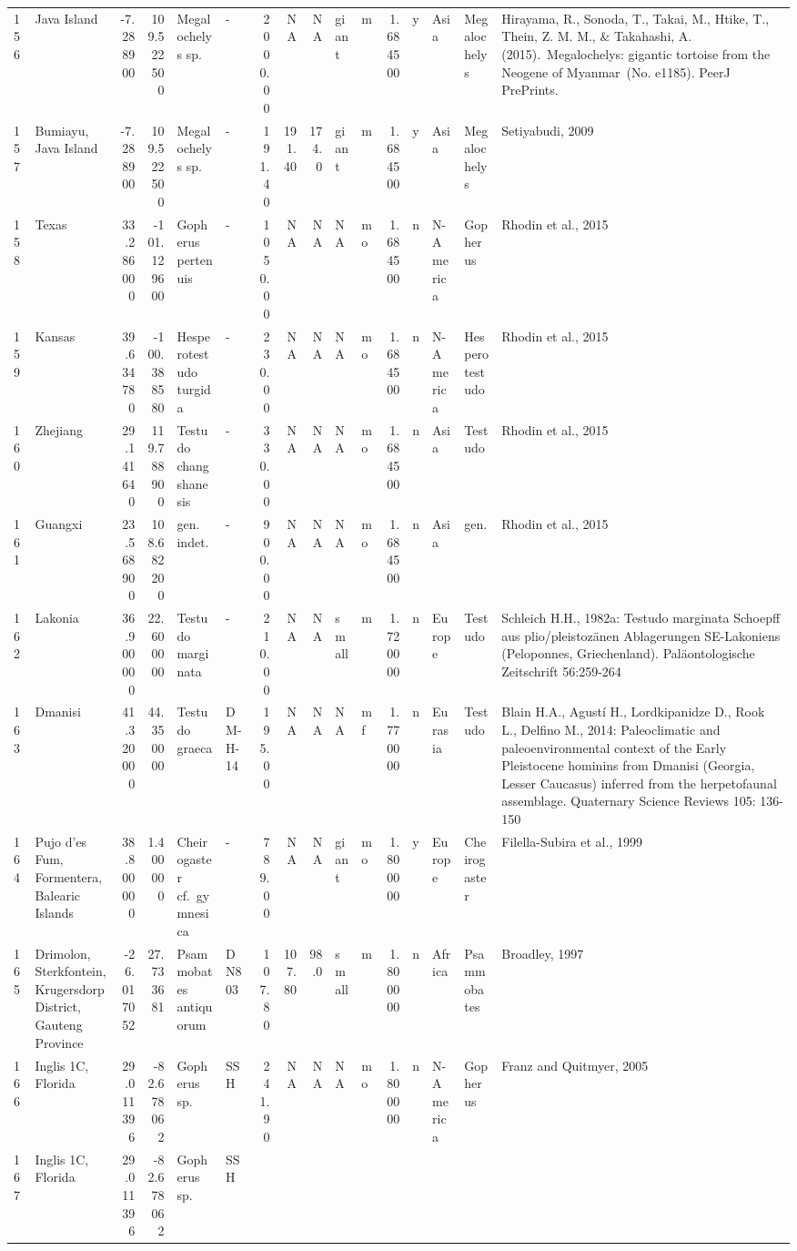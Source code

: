 \documentclass[]{article}
\begin{document}
\begin{longtable}[]{@{}llrrllrrrllrllll@{}}
156 & Java Island & -7.288900 & 109.522500 & Megalochelys sp. & - &
2000.00 & NA & NA & giant & m & 1.684500 & y & Asia & Megalochelys &
Hirayama, R., Sonoda, T., Takai, M., Htike, T., Thein, Z. M. M., \&
Takahashi, A. (2015).~Megalochelys: gigantic tortoise from the Neogene
of Myanmar~(No. e1185). PeerJ PrePrints.\tabularnewline
157 & Bumiayu, Java Island & -7.288900 & 109.522500 & Megalochelys sp. &
- & 191.40 & 191.40 & 174.0 & giant & m & 1.684500 & y & Asia &
Megalochelys & Setiyabudi, 2009\tabularnewline
158 & Texas & 33.286000 & -101.129600 & Gopherus pertenuis & - & 1050.00
& NA & NA & NA & mo & 1.684500 & n & N-America & Gopherus & Rhodin et
al., 2015\tabularnewline
159 & Kansas & 39.634780 & -100.388580 & Hesperotestudo turgida & - &
230.00 & NA & NA & NA & mo & 1.684500 & n & N-America & Hesperotestudo &
Rhodin et al., 2015\tabularnewline
160 & Zhejiang & 29.141640 & 119.788900 & Testudo changshanesis & - &
330.00 & NA & NA & NA & mo & 1.684500 & n & Asia & Testudo & Rhodin et
al., 2015\tabularnewline
161 & Guangxi & 23.568900 & 108.682200 & gen. indet. & - & 900.00 & NA &
NA & NA & mo & 1.684500 & n & Asia & gen. & Rhodin et al.,
2015\tabularnewline
162 & Lakonia & 36.900000 & 22.600000 & Testudo marginata & - & 210.00 &
NA & NA & small & m & 1.720000 & n & Europe & Testudo & Schleich H.H.,
1982a: Testudo marginata Schoepff aus plio/pleistozänen Ablagerungen
SE-Lakoniens (Peloponnes, Griechenland). Paläontologische Zeitschrift
56:259-264\tabularnewline
163 & Dmanisi & 41.320000 & 44.350000 & Testudo graeca & DM-H-14 &
195.00 & NA & NA & NA & mf & 1.770000 & n & Eurasia & Testudo & Blain
H.A., Agustí H., Lordkipanidze D., Rook L., Delfino M., 2014:
Paleoclimatic and paleoenvironmental context of the Early Pleistocene
hominins from Dmanisi (Georgia, Lesser Caucasus) inferred from the
herpetofaunal assemblage. Quaternary Science Reviews 105:
136-150\tabularnewline
164 & Pujo d'es Fum, Formentera, Balearic Islands & 38.800000 & 1.400000
& Cheirogaster cf.~gymnesica & - & 789.00 & NA & NA & giant & mo &
1.800000 & y & Europe & Cheirogaster & Filella-Subira et al.,
1999\tabularnewline
165 & Drimolon, Sterkfontein, Krugersdorp District, Gauteng Province &
-26.017052 & 27.733681 & Psammobates antiquorum & DN803 & 107.80 &
107.80 & 98.0 & small & m & 1.800000 & n & Africa & Psammobates &
Broadley, 1997\tabularnewline
166 & Inglis 1C, Florida & 29.011396 & -82.678062 & Gopherus sp. & SSH &
241.90 & NA & NA & NA & mo & 1.800000 & n & N-America & Gopherus & Franz
and Quitmyer, 2005\tabularnewline
167 & Inglis 1C, Florida & 29.011396 & -82.678062 & Gopherus sp. & SSH &

\end{longtable}
\end{document}
